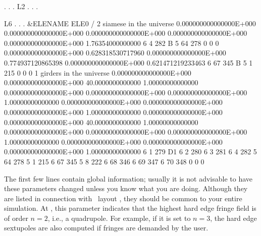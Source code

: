 \begin{ptccode}
     .
     .
     .
L2 
     .
     .
     .
\end{ptccode}
\begin{ptccode}
L6
     .
     .
     .
 &ELENAME
 ELE0%
 /
           2  siamese in the universe \label{lin:mu:sia}
  0.000000000000000E+000  0.000000000000000E+000  0.000000000000000E+000  
  0.000000000000000E+000  0.000000000000000E+000   1.76354000000000        
           6           4         282 B                       
           5          64         278
           0           0           0
  0.000000000000000E+000  0.628318530717960       0.000000000000000E+000  \label{lin:sia:rot}
  0.774937120865398       0.000000000000000E+000  0.621471219233463            \label{lin:sia:tra}
           6          67         345 B                        \label{lin:sia:1}
           5           1         215                            \label{lin:sia:2}
           0           0           0
           1  girders in the universe 
  0.000000000000000E+000  0.000000000000000E+000   40.0000000000000      \label{lin:gir:f}
   1.00000000000000       0.000000000000000E+000  0.000000000000000E+000
  0.000000000000000E+000   1.00000000000000       0.000000000000000E+000
  0.000000000000000E+000  0.000000000000000E+000   1.00000000000000     
  0.000000000000000E+000  0.000000000000000E+000   40.0000000000000     
   1.00000000000000       0.000000000000000E+000  0.000000000000000E+000
  0.000000000000000E+000   1.00000000000000       0.000000000000000E+000
  0.000000000000000E+000  0.000000000000000E+000   1.00000000000000     
           6           1         279 D1      \label{lin:gir:m}                  
           6           2         280
           6           3         281
           6           4         282     \label{lin:gir:s11} 
           5          64         278    \label{lin:gir:s12} 
           5           1         215     \label{lin:gir:s22} 
           6          67         345    \label{lin:gir:s21}       
           5           8         222
           6          68         346
           6          69         347
           6          70         348
           0           0           0
\end{ptccode}

The first few lines contain global information; usually it is not advisable to have these parameters  changed unless you know what you are doing. Although they are listed in connection with \DNA\ layout , they should be common to your entire simulation. At , this parameter indicates that the highest hard edge  fringe field is of order $n=2$, i.e., a quadrupole. For example, if it is set to $n=3$,  the hard edge sextupoles are also computed if fringes are demanded by the user. 

